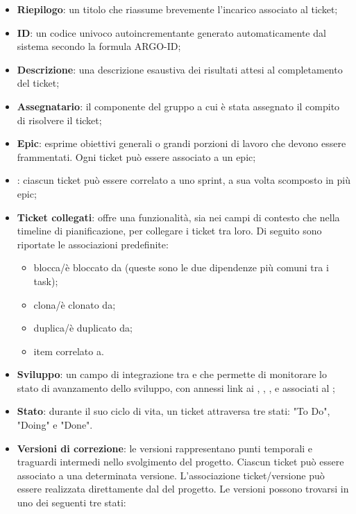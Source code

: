 \begin{itemize}
  \item \textbf{Riepilogo}: un titolo che riassume brevemente l'incarico associato al ticket;
  \item \textbf{ID}: un codice univoco autoincrementante generato automaticamente dal sistema secondo la formula ARGO-ID;
  \item \textbf{Descrizione}: una descrizione esaustiva dei risultati attesi al completamento del ticket;
  \item \textbf{Assegnatario}: il componente del gruppo a cui è stata assegnato il compito di risolvere il ticket;
  \item \textbf{Epic}: esprime obiettivi generali o grandi porzioni di lavoro che devono essere frammentati. Ogni ticket può essere associato a un epic;
  \item \textbf{}: ciascun ticket può essere correlato a uno sprint, a sua volta scomposto in più epic;
  \item \textbf{Ticket collegati}:  offre una funzionalità, sia nei campi di contesto che nella timeline di pianificazione, per collegare i ticket tra loro. Di seguito sono riportate le associazioni predefinite:
    \begin{itemize}
      \item blocca/è bloccato da (queste sono le due dipendenze più comuni tra i task);
      \item clona/è clonato da;
      \item duplica/è duplicato da;
      \item item correlato a.
    \end{itemize}
  \item \textbf{Sviluppo}: un campo di integrazione tra  e  che permette di monitorare lo stato di avanzamento dello sviluppo, con annessi link ai , , ,  e  associati al ;
  \item \textbf{Stato}: durante il suo ciclo di vita, un ticket attraversa tre stati: "To Do", "Doing" e "Done".
  \item \textbf{Versioni di correzione}: le versioni rappresentano punti temporali e traguardi intermedi nello svolgimento del progetto. Ciascun ticket può essere associato a una determinata versione. L'associazione ticket/versione può essere realizzata direttamente dal  del progetto. Le versioni possono trovarsi in uno dei seguenti tre stati:

\end{itemize}
